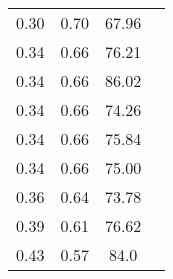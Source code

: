 \begin{longtable}[H]{ c c c c }
	 0.30 & 0.70 & 67.96 & \cite{Ozaki2004}\\
	 0.34 & 0.66 & 76.21 & \cite{Karre2015}\\
	 0.34 & 0.66 & 86.02 & \cite{Karre2015}\\
	 0.34 & 0.66 & 74.26 & \cite{Ozaki2004}\\
	 0.34 & 0.66 & 75.84 & \cite{Karre2015}\\
	 0.34 & 0.66 & 75.00 & \cite{Timoshevskii2011}\\
	 0.36 & 0.64 & 73.78 & \cite{Timoshevskii2011}\\
	 0.39 & 0.61 & 76.62 & \cite{Timoshevskii2011}\\
	 0.43 & 0.57 & 84.0 & \cite{Ozaki2004}\\
	\hline
\end{longtable}
